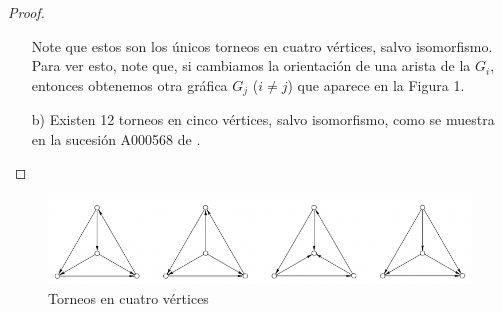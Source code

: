 \documentclass[12pt]{article}
\begin{document}
\begin{proof}
\begin{itemize}
    Note que estos son los únicos torneos en cuatro vértices, salvo isomorfismo. Para ver esto, note que, si cambiamos la orientación de una arista de la $G_i$, entonces obtenemos otra gráfica $G_j$ ($i \neq j$) que aparece en la Figura 1.
    
    \item[b)] Existen 12 torneos en  cinco vértices, salvo isomorfismo, como se muestra en la sucesión A000568 de \cite{oeis}.
\end{itemize}
 
\end{proof}
\begin{figure}[h]
    \centering
    \includegraphics[scale=0.60]{pics/graph3.png}
    \caption{Torneos en cuatro vértices}
    \label{fig:fig1}
\end{figure}
\end{document}
